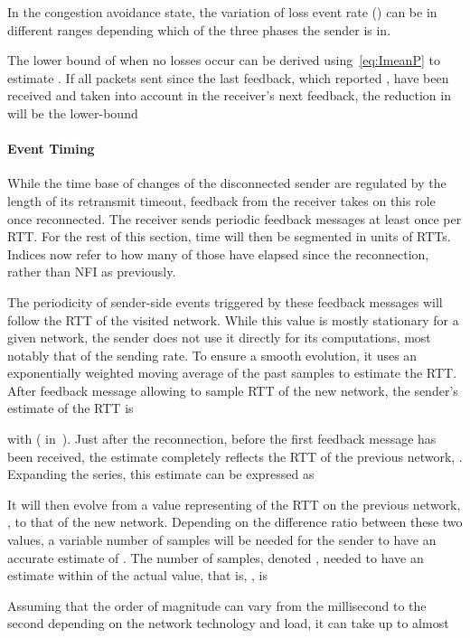 \documentclass[twocolumn]{nictatechreport}
\begin{document}
In the congestion avoidance state, the variation of loss event rate () can be in different
ranges depending which of the three phases the sender is in.
 
The lower bound of  when no losses occur can be derived
using~\eqref{eq:ImeanP} to estimate . If all
 packets sent since the last feedback, which reported
, have been received and taken into account in the receiver's
next feedback, the reduction in  will be the lower-bound


\paragraph{Event Timing}

While the time base of changes of the disconnected sender are regulated by the
length of its retransmit timeout, feedback from the receiver takes on this role
once reconnected. The receiver sends periodic feedback messages at least once
per RTT. For the rest of this section, time will then be segmented in units of
RTTs. Indices  now refer to how many of those have elapsed since the
reconnection, rather than NFI as previously.

The periodicity of sender-side events triggered by these feedback messages will
follow the RTT of the visited network.  While this value is mostly
stationary for a given network, the sender does not use it directly for its
computations, most notably that of the sending rate. To ensure a smooth
evolution, it uses an exponentially weighted moving average of the past samples
to estimate the RTT. After feedback message  allowing to sample RTT
 of the new network, the sender's estimate of the RTT is

with  ( in~\cite{rfc5348}).  Just after the reconnection, before
the first feedback message has been received, the estimate completely reflects
the RTT of the previous network, .
Expanding the series, this estimate can be expressed as

It will then evolve from a value representing of the RTT on the previous
network, , to that of the new network. Depending on the
difference ratio between these two values, a variable number of samples will be
needed for the sender to have an accurate estimate of . The
number of samples, denoted , needed to have an estimate within
 of the actual value, that is,  , is

Assuming that the order of magnitude can vary from the millisecond to the second
depending on the network technology and load, it can take up to almost 30 RTTs
on the new network for the estimate to be accurate within a 5\,\% margin.
\end{document}
